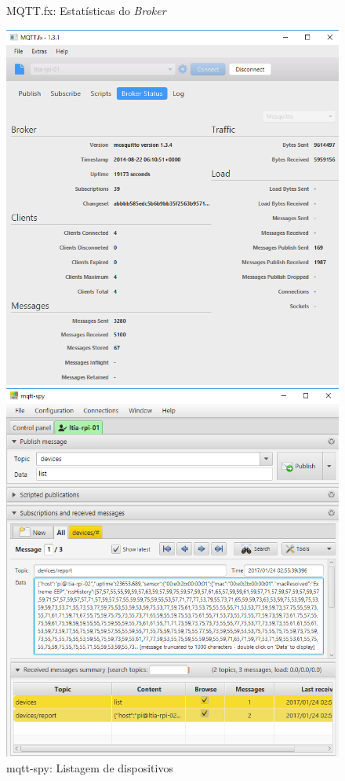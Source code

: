 \begin{figure}[htb]
	\begin{minipage}{0.48\textwidth}
		\centering
		\caption{\label{fig-mqttfx-stats}MQTT.fx: Estatísticas do \emph{Broker}}
		\includegraphics[width=1\textwidth]{052-gateway/mqtt/mqttfx-stats.png}
	\end{minipage}
\hfill
	\begin{minipage}{0.48\textwidth}
		\centering
		\caption{\label{fig-mqtt-spy-list}mqtt-spy: Listagem de dispositivos}
		\includegraphics[width=1\textwidth]{052-gateway/mqtt/mqtt-spy-list.png}
	\end{minipage}
\end{figure}
